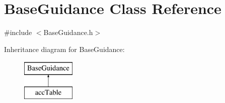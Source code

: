 \hypertarget{class_base_guidance}{}\section{Base\+Guidance Class Reference}
\label{class_base_guidance}


{\ttfamily \#include $<$Base\+Guidance.\+h$>$}

Inheritance diagram for Base\+Guidance\+:\begin{figure}[H]
\begin{center}
\leavevmode
\includegraphics[height=2.000000cm]{class_base_guidance}
\end{center}
\end{figure}
